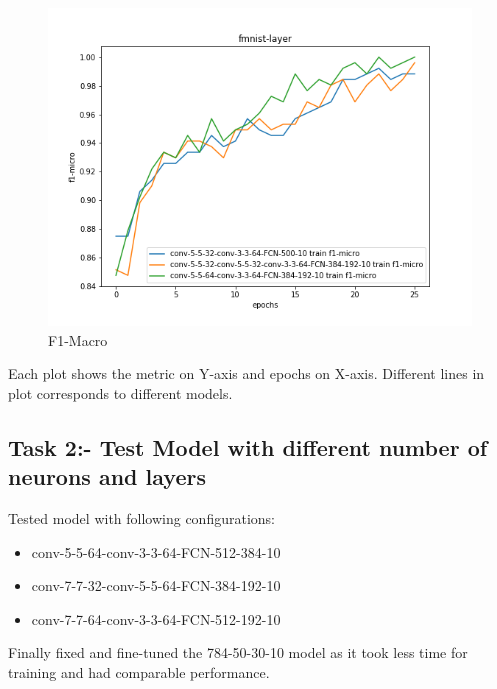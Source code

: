 \documentclass{article}
\begin{document}
\begin{figure}[!htb]
	\includegraphics[width=\linewidth]{../output_plots/FMNIST/task-1/fmnist-layer-F1-micro-score-f1-micro.png}
	\caption{F1-Macro}\label{fig:part_1_task_1_f1-macro}
	\endminipage
\end{figure}

Each plot shows the metric on Y-axis and epochs on X-axis. Different lines in plot corresponds to different models.

\subsection{Task 2:- Test Model with different number of neurons and layers}

Tested model with following configurations:
\begin{itemize}
	\item conv-5-5-64-conv-3-3-64-FCN-512-384-10
	\item conv-7-7-32-conv-5-5-64-FCN-384-192-10
	\item conv-7-7-64-conv-3-3-64-FCN-512-192-10
\end{itemize}

Finally fixed and fine-tuned the 784-50-30-10 model as it took less time for training and had comparable performance.
\end{document}
